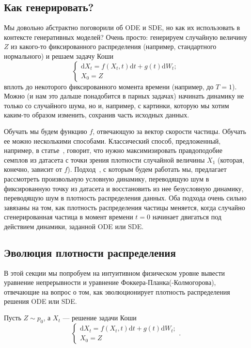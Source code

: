 \documentclass[12pt]{article}
\theoremstyle{definition}
\begin{document}
\subsection{Как генерировать?}

Мы довольно абстрактно поговорили об ODE и SDE, но как их использовать в контексте генеративных моделей? Очень просто: генерируем случайную величину $Z$ из какого-то фиксированного распределения (например, стандартного нормального) и решаем задачу Коши
\[
    \begin{cases}
        \mathrm{d} X_t = f(X_t, t) \mathrm{d} t + g(t) \mathrm{d} W_t;\\
        X_0 = Z
    \end{cases}
\]
вплоть до некоторого фиксированного момента времени (например, до $T = 1$). Можно (и нам это дальше понадобится в парных задачах) начинать динамику не только со случайного шума, но и, например, с картинки, которую мы хотим каким-то образом изменить, сохранив часть исходных данных.

Обучать мы будем функцию $f$, отвечающую за вектор скорости частицы. Обучать ее можно несколькими способами. Классический способ, предложенный, например, в статье~\cite{grathwohl2018ffjord}, говорит, что нужно максимизировать правдоподобие семплов из датасета с точки зрения плотности случайной величины $X_1$ (которая, конечно, зависит от $f$). Подход~\cite{lipman2022flow}, с которым будем работать мы, предлагает рассмотреть произвольную условную динамику, переводящую шум в фиксированную точку из датасета и восстановить из нее безусловную динамику, переводящую шум в плотность распределения данных. Оба подхода очень сильно завязаны на том, как плотность распределения частицы меняется, когда случайно сгенерированная частица в момент времени $t = 0$ начинает двигаться под действием динамики, заданной ODE или SDE.

\subsection{Эволюция плотности распределения}

В этой секции мы попробуем на интуитивном физическом уровне вывести уравнение непрерывности и уравнение Фоккера-Планка(-Колмогорова), отвечающие на вопрос о том, как эволюционирует плотность распределения решения ODE или SDE.

Пусть $Z \sim p_0$, а $X_t$ --- решение задачи Коши
\[
    \begin{cases}
        \mathrm{d} X_t = f(X_t, t) \mathrm{d} t + g(t) \mathrm{d} W_t;\\
        X_0 = Z
    \end{cases}.
\]
\end{document}
